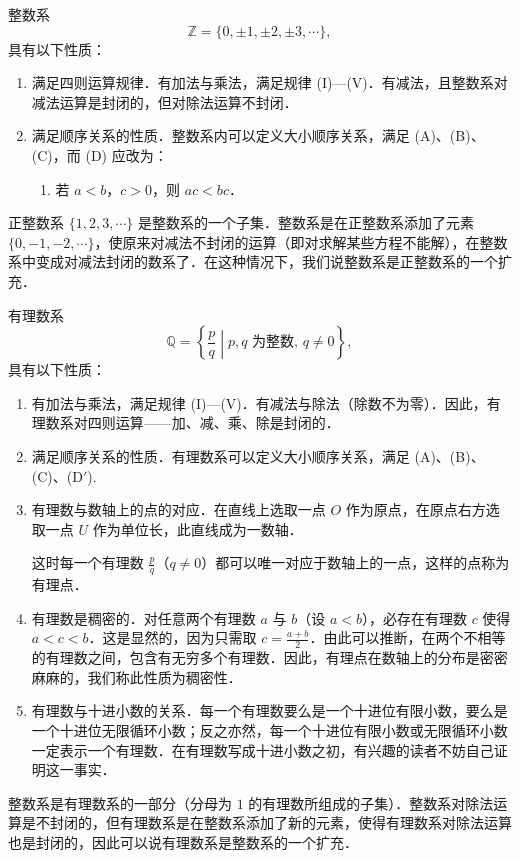 \begin{example}
整数系
\[
\mathbb{Z} = \{0,\pm 1,\pm 2,\pm 3,\cdots\},
\]
具有以下性质：
\begin{enumerate}[label=\arabic*.]
  \item 满足四则运算规律．有加法与乘法，满足规律 (I)—(V)．有减法，且整数系对减法运算是封闭的，但对除法运算不封闭．
  \item 满足顺序关系的性质．整数系内可以定义大小顺序关系，满足 (A)、(B)、(C)，而 (D) 应改为：
  \begin{enumerate}[label=(D$'$)]
    \item 若 $a<b$，$c>0$，则 $ac<bc$．
  \end{enumerate}
\end{enumerate}
正整数系 $\{1,2,3,\cdots\}$ 是整数系的一个子集．整数系是在正整数系添加了元素 $\{0,-1,-2,\cdots\}$，使原来对减法不封闭的运算（即对求解某些方程不能解），在整数系中变成对减法封闭的数系了．在这种情况下，我们说整数系是正整数系的一个扩充．
\end{example}

\begin{example}
有理数系
\[
\mathbb{Q} = \left\{\frac{p}{q}\mathrel{}\middle|\mathrel{} p,q \text{ 为整数},\, q\neq 0\right\},
\]
具有以下性质：
\begin{enumerate}[label=\arabic*.]
  \item 有加法与乘法，满足规律 (I)—(V)．有减法与除法（除数不为零）．因此，有理数系对四则运算——加、减、乘、除是封闭的．
  \item 满足顺序关系的性质．有理数系可以定义大小顺序关系，满足 (A)、(B)、(C)、(D$'$).
  \item 有理数与数轴上的点的对应．在直线上选取一点 $O$ 作为原点，在原点右方选取一点 $U$ 作为单位长，此直线成为一数轴．
  \begin{figure}[htbp]
  \centering
  \caption{\relax}\label{fig:1-1}
  \end{figure}
  这时每一个有理数 $\frac{p}{q}$（$q\neq 0$）都可以唯一对应于数轴上的一点，这样的点称为有理点．

  \item 有理数是稠密的．对任意两个有理数 $a$ 与 $b$（设 $a<b$），必存在有理数 $c$ 使得 $a<c<b$．这是显然的，因为只需取 $c=\frac{a+b}{2}$．由此可以推断，在两个不相等的有理数之间，包含有无穷多个有理数．因此，有理点在数轴上的分布是密密麻麻的，我们称此性质为稠密性．

  \item 有理数与十进小数的关系．每一个有理数要么是一个十进位有限小数，要么是一个十进位无限循环小数；反之亦然，每一个十进位有限小数或无限循环小数一定表示一个有理数．在有理数写成十进小数之初，有兴趣的读者不妨自己证明这一事实．
\end{enumerate}
整数系是有理数系的一部分（分母为 $1$ 的有理数所组成的子集）．整数系对除法运算是不封闭的，但有理数系是在整数系添加了新的元素，使得有理数系对除法运算也是封闭的，因此可以说有理数系是整数系的一个扩充．
\end{example}

